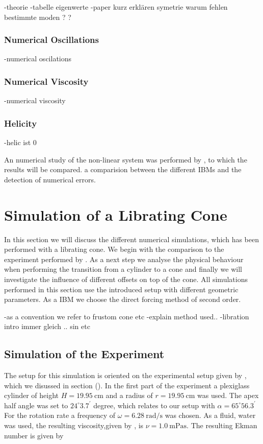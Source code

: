 -theorie
-tabelle eigenwerte
-paper kurz erklären symetrie warum fehlen bestimmte moden ? ?
\subsubsection{Numerical Oscillations}
-numerical oscilations
\subsubsection{Numerical Viscosity}
-numerical viscosity
\subsubsection{Helicity}
-helic ist 0

An numerical study of the non-linear system was performed by \citep{BLA}, to which the results will be compared.
a comparision between the different IBMs and the detection of numerical errors.

\newpage

\section{Simulation of a Librating Cone}

In this section we will discuss the different numerical simulations, which has been performed
with a librating cone. We begin with the comparison to the experiment performed by \citep{Beardsley1970}.
As a next step we analyse the physical behaviour when performing the transition from a cylinder
to a cone and finally  we will investigate the influence of different offsets on top of the cone.
All simulations performed in this section use the introduced setup with different geometric parameters.
As a IBM we choose the direct forcing  method of second order.

-as a convention we refer to frustom cone etc
-explain method used..
-libration intro immer gleich .. sin etc

\subsection{Simulation of the Experiment}

The setup for this simulation is oriented on the experimental setup given by \citep{Beardsley1970}, which
we disussed in section ().
In the first part of the experiment a plexiglass cylinder of height $H=\SI{19.95}{\centi\meter}$ and a radius of
$r=\SI{19.95}{\centi\meter}$ was used. The apex half angle was set to $24^{\circ}3.7^{\prime}$ degree,
which relates to our setup with $\alpha=65^{\circ}56.3^{\prime}$
For the rotation rate a frequency of $\omega =\SI{6.28}{\radian\per\second}$ was chosen.
As a fluid, water was used, the resulting viscosity,given by \citep{tipler2003}, is $\nu = \SI{1.0}{\milli\pascal\second}$.
The resulting Ekman number is given by

